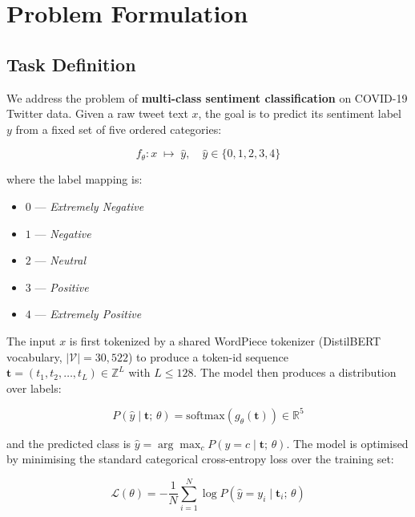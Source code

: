 \section{Problem Formulation}

\subsection{Task Definition}

We address the problem of \textbf{multi-class sentiment classification} on COVID-19 Twitter data. Given a raw tweet text $x$, the goal is to predict its sentiment label $y$ from a fixed set of five ordered categories:

\begin{equation}
    f_\theta : x \;\longmapsto\; \hat{y}, \quad \hat{y} \in \{0, 1, 2, 3, 4\}
\end{equation}

where the label mapping is:
\begin{itemize}
    \item $0$ — \textit{Extremely Negative}
    \item $1$ — \textit{Negative}
    \item $2$ — \textit{Neutral}
    \item $3$ — \textit{Positive}
    \item $4$ — \textit{Extremely Positive}
\end{itemize}

The input $x$ is first tokenized by a shared WordPiece tokenizer (DistilBERT vocabulary, $|\mathcal{V}|=30{,}522$) to produce a token-id sequence $\mathbf{t} = (t_1, t_2, \ldots, t_L) \in \mathbb{Z}^{L}$ with $L \leq 128$. The model then produces a distribution over labels:

\begin{equation}
    P(\hat{y} \mid \mathbf{t};\,\theta) = \mathrm{softmax}\!\left(g_\theta(\mathbf{t})\right) \in \mathbb{R}^{5}
\end{equation}

and the predicted class is $\hat{y} = \arg\max_c P(\hat{y}=c \mid \mathbf{t};\,\theta)$. The model is optimised by minimising the standard categorical cross-entropy loss over the training set:

\begin{equation}
    \mathcal{L}(\theta) = -\frac{1}{N}\sum_{i=1}^{N} \log P\!\left(\hat{y}=y_i \mid \mathbf{t}_i;\,\theta\right)
\end{equation}

